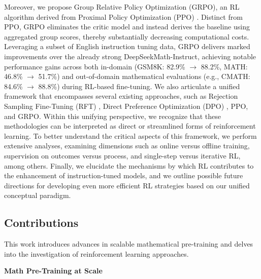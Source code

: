 Moreover, we propose Group Relative Policy Optimization (GRPO), an RL algorithm derived from Proximal Policy Optimization (PPO) \citep{schulman2017proximal}. Distinct from PPO, GRPO eliminates the critic model and instead derives the baseline using aggregated group scores, thereby substantially decreasing computational costs. Leveraging a subset of English instruction tuning data, GRPO delivers marked improvements over the already strong DeepSeekMath-Instruct, achieving notable performance gains across both in-domain (GSM8K: 82.9\% $\rightarrow$ 88.2\%, MATH: 46.8\% $\rightarrow$ 51.7\%) and out-of-domain mathematical evaluations (e.g., CMATH: 84.6\% $\rightarrow$ 88.8\%) during RL-based fine-tuning. We also articulate a unified framework that encompasses several existing approaches, such as Rejection Sampling Fine-Tuning (RFT) \citep{yuan2023scaling}, Direct Preference Optimization (DPO) \citep{dpo}, PPO, and GRPO. Within this unifying perspective, we recognize that these methodologies can be interpreted as direct or streamlined forms of reinforcement learning. To better understand the critical aspects of this framework, we perform extensive analyses, examining dimensions such as online versus offline training, supervision on outcomes versus process, and single-step versus iterative RL, among others. Finally, we elucidate the mechanisms by which RL contributes to the enhancement of instruction-tuned models, and we outline possible future directions for developing even more efficient RL strategies based on our unified conceptual paradigm.

\subsection{Contributions}
This work introduces advances in scalable mathematical pre-training and delves into the investigation of reinforcement learning approaches.

\textbf{Math Pre-Training at Scale}

